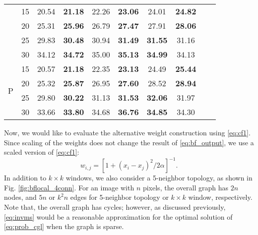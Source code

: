 \documentclass{article}
\begin{document}
\begin{table}
\begin{tabular}{|c||c||c|c||c|c||c|c||c|c||}
& 15 & 20.54 & {\bf 21.18} & 22.26 & {\bf 23.06} & 24.01 & {\bf 24.82} \\
& 20 & 25.31 & {\bf 25.96} & 26.79 & {\bf 27.47} & 27.91 & {\bf 28.06} \\
& 25 & 29.83 & {\bf 30.48} & 30.94 & {\bf 31.49} & {\bf 31.55} & 31.16 \\
& 30 & 34.12 & {\bf 34.72} & 35.00 & {\bf 35.13} & {\bf 34.99} & 34.13 \\
\hline
\multirow{4}{*}{P} 
& 15 & 20.57 & {\bf 21.18} & 22.35 & {\bf 23.13} & 24.49 & {\bf 25.44} \\
& 20 & 25.32 & {\bf 25.87} & 26.95 & {\bf 27.60} & 28.52 & {\bf 28.94} \\
& 25 & 29.80 & {\bf 30.22} & 31.13 & {\bf 31.53} & {\bf 32.06} & 31.97 \\
& 30 & 33.66 & {\bf 33.80} & 34.68 & {\bf 36.76} & {\bf 34.85} & 34.30 \\
\hline 
\end{tabular}
\end{table}

Now, we would like to evaluate the alternative weight construction using \eqref{eq:cf1}. Since scaling of the weights does not change the result of \eqref{eq:bf_output}, we use a scaled version of \eqref{eq:cf1}:
\begin{equation}
\label{eq:invms}
  w_{i,j}=\left[1+(x_i-x_j)^2/2\alpha\right]^{-1}.
\end{equation}
In addition to $k\times k$ windows, we also consider a 5-neighbor topology, as shown in Fig. \ref{fig:bflocal_4conn}. For an image with $n$ pixels, the overall graph has $2n$ nodes, and $5n$ or $k^2n$ edges for 5-neighbor topology or $k\times k$ window, respectively. Note that, the overall graph has cycles; however, as discussed previously, \eqref{eq:invms} would be a reasonable approximation for the optimal solution of \eqref{eq:prob_cgl} when the graph is sparse. 
\end{document}
